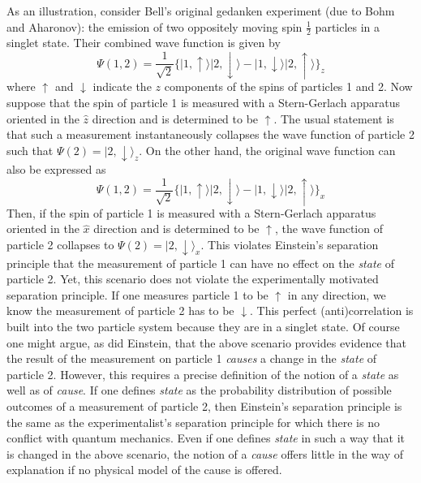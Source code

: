 \documentclass[12pt]{article}
\begin{document}
As an illustration, consider Bell's original gedanken experiment (due to Bohm and Aharonov\cite{Boh57}): the emission of two oppositely moving spin $\frac{1}{2}$ particles in a singlet state. Their combined wave function is given by
\begin{equation}
	\Psi (1,2)= \frac{1}{\sqrt{2}} \{|1,\uparrow \rangle |2,\downarrow \rangle -  |1,\downarrow \rangle |2,\uparrow \rangle \}_z
\end{equation}
where $\uparrow$ and $\downarrow$ indicate the $z$ components of the spins of particles 1 and 2.  Now suppose that the spin of particle 1 is measured with a Stern-Gerlach apparatus oriented in the $\hat{z}$ direction and is determined to be $\uparrow$. The usual statement is that such a measurement instantaneously collapses the wave function of particle 2 such that $\Psi (2)= |2,\downarrow \rangle_z$. On the other hand, the original wave function can also be expressed as
\begin{equation}
	\Psi (1,2)= \frac{1}{\sqrt{2}} \{|1,\uparrow \rangle |2,\downarrow \rangle -  |1,\downarrow \rangle |2,\uparrow \rangle \}_x
\end{equation}
Then, if the spin of particle 1 is measured with a Stern-Gerlach apparatus oriented in the $\hat{x}$ direction and is determined to be $\uparrow$, the wave function of particle 2 collapses to $\Psi (2)= |2,\downarrow \rangle_x$.  This violates Einstein's separation principle that the measurement of particle 1 can have no effect on the {\it state} of particle 2. Yet, this scenario does not violate the experimentally motivated separation principle. If one measures particle 1 to be $\uparrow$ in any direction, we know the measurement of particle 2 has to be $\downarrow$. This perfect (anti)correlation is built into the two particle system because they are in a singlet state.  Of course one might argue, as did Einstein, that the above scenario provides evidence that the result of the measurement on particle 1 {\it causes} a change in the {\it state} of particle 2.  However, this requires a precise definition of the notion of a {\it state} as well as of {\it cause}.  If one defines {\it state} as the probability distribution of possible outcomes of a measurement of particle 2, then Einstein's separation principle is the same as the experimentalist's separation principle for which there is no conflict with quantum mechanics.  Even if one defines {\it state} in such a way that it is changed in the above scenario, the notion of a {\it cause} offers little in the way of explanation if no physical model of the cause is offered. 
\end{document}
